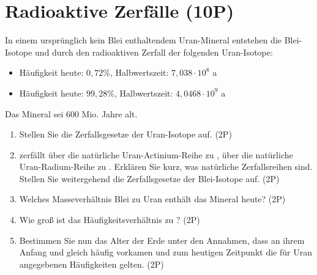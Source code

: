 \section{Radioaktive Zerfälle (10P)}

In einem ursprünglich kein Blei enthaltendem Uran-Mineral entstehen die Blei-Isotope  und  durch den radioaktiven Zerfall der folgenden Uran-Isotope:
\begin{itemize}
          \item {} \qquad Häufigkeit heute: $0,72\%$, Halbwertszeit: $7,038\cdot10^8$ \unit{a}
          \item {} \qquad Häufigkeit heute: $99,28\%$, Halbwertszeit: $4,0468\cdot10^9$ \unit{a} 
\end{itemize}
Das Mineral sei $600$ Mio. Jahre alt.

\begin{enumerate}
\item Stellen Sie die Zerfallsgesetze der Uran-Isotope auf. (2P)

\item {} zerfällt über die natürliche Uran-Actinium-Reihe zu ,  über die natürliche Uran-Radium-Reihe zu . Erklären Sie kurz, was natürliche Zerfallsreihen sind. Stellen Sie weitergehend die Zerfallsgesetze der Blei-Isotope auf. (2P)

\item Welches Masseverhältnis
Blei zu Uran enthält das Mineral heute? (2P)

\item Wie groß ist das
Häufigkeitsverhältnis  zu ? (2P)

\item Bestimmen Sie nun das Alter der Erde unter den Annahmen, dass an
ihrem Anfang  und  gleich häufig vorkamen und zum heutigen Zeitpunkt die für Uran angegebenen Häufigkeiten gelten. (2P)
\end{enumerate}